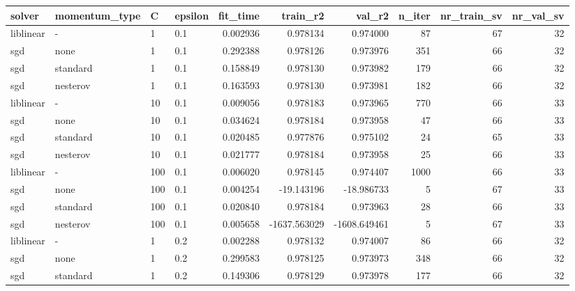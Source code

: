 \begin{tabular}{llllrrrrrr}
\toprule
   solver & momentum\_type &   C & epsilon &  fit\_time &     train\_r2 &       val\_r2 &  n\_iter &  nr\_train\_sv &  nr\_val\_sv \\
\midrule
liblinear &             - &   1 &     0.1 &  0.002936 &     0.978134 &     0.974000 &      87 &           67 &         32 \\
      sgd &          none &   1 &     0.1 &  0.292388 &     0.978126 &     0.973976 &     351 &           66 &         32 \\
      sgd &      standard &   1 &     0.1 &  0.158849 &     0.978130 &     0.973982 &     179 &           66 &         32 \\
      sgd &      nesterov &   1 &     0.1 &  0.163593 &     0.978130 &     0.973981 &     182 &           66 &         32 \\
liblinear &             - &  10 &     0.1 &  0.009056 &     0.978183 &     0.973965 &     770 &           66 &         33 \\
      sgd &          none &  10 &     0.1 &  0.034624 &     0.978184 &     0.973958 &      47 &           66 &         33 \\
      sgd &      standard &  10 &     0.1 &  0.020485 &     0.977876 &     0.975102 &      24 &           65 &         33 \\
      sgd &      nesterov &  10 &     0.1 &  0.021777 &     0.978184 &     0.973958 &      25 &           66 &         33 \\
liblinear &             - & 100 &     0.1 &  0.006020 &     0.978145 &     0.974407 &    1000 &           66 &         33 \\
      sgd &          none & 100 &     0.1 &  0.004254 &   -19.143196 &   -18.986733 &       5 &           67 &         33 \\
      sgd &      standard & 100 &     0.1 &  0.020840 &     0.978184 &     0.973963 &      28 &           66 &         33 \\
      sgd &      nesterov & 100 &     0.1 &  0.005658 & -1637.563029 & -1608.649461 &       5 &           67 &         33 \\
liblinear &             - &   1 &     0.2 &  0.002288 &     0.978132 &     0.974007 &      86 &           66 &         32 \\
      sgd &          none &   1 &     0.2 &  0.299583 &     0.978125 &     0.973973 &     348 &           66 &         32 \\
      sgd &      standard &   1 &     0.2 &  0.149306 &     0.978129 &     0.973978 &     177 &           66 &         32 \\

\end{tabular}
